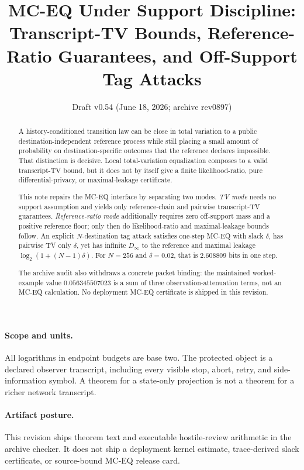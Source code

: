 \documentclass[11pt]{article}
\title{MC-EQ Under Support Discipline:\\
Transcript-TV Bounds, Reference-Ratio Guarantees, and Off-Support Tag Attacks}
\author{}
\date{Draft v0.54 (June 18, 2026; archive rev0897)}
\begin{document}
\maketitle

\begin{abstract}
A history-conditioned transition law can be close in total variation to a public destination-independent reference process while still placing a small amount of probability on destination-specific outcomes that the reference declares impossible.  That distinction is decisive.  Local total-variation equalization composes to a valid transcript-TV bound, but it does not by itself give a finite likelihood-ratio, pure differential-privacy, or maximal-leakage certificate.

This note repairs the MC-EQ interface by separating two modes.  \emph{TV mode} needs no support assumption and yields only reference-chain and pairwise transcript-TV guarantees.  \emph{Reference-ratio mode} additionally requires zero off-support mass and a positive reference floor; only then do likelihood-ratio and maximal-leakage bounds follow.  An explicit $N$-destination tag attack satisfies one-step MC-EQ with slack $\delta$, has pairwise TV only $\delta$, yet has infinite $D_\infty$ to the reference and maximal leakage $\log_2(1+(N-1)\delta)$.  For $N=256$ and $\delta=0.02$, that is $2.608809$ bits in one step.

The archive audit also withdraws a concrete packet binding: the maintained worked-example value $0.056345507023$ is a sum of three observation-attenuation terms, not an MC-EQ calculation.  No deployment MC-EQ certificate is shipped in this revision.
\end{abstract}

\paragraph{Scope and units.}
All logarithms in endpoint budgets are base two.  The protected object is a declared observer transcript, including every visible stop, abort, retry, and side-information symbol.  A theorem for a state-only projection is not a theorem for a richer network transcript.

\paragraph{Artifact posture.}
This revision ships theorem text and executable hostile-review arithmetic in the archive checker.  It does not ship a deployment kernel estimate, trace-derived slack certificate, or source-bound MC-EQ release card.
\end{document}
